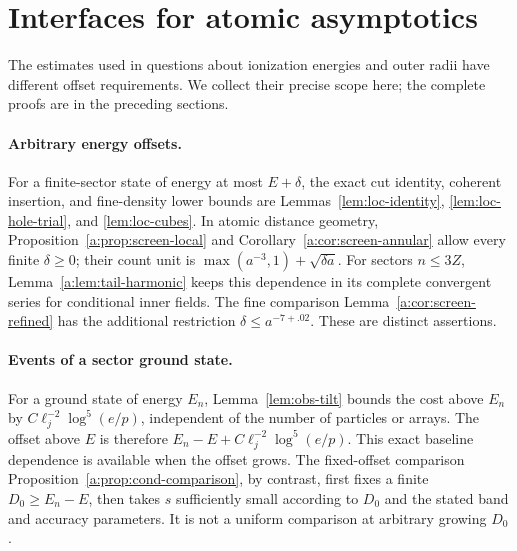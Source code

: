 \section{Interfaces for atomic asymptotics}\label{sec:interfaces}

The estimates used in questions about ionization energies and outer radii
have different offset requirements. We collect their precise scope here;
the complete proofs are in the preceding sections.

\paragraph{Arbitrary energy offsets.}
For a finite-sector state of energy at most $E+\delta$, the exact cut
identity, coherent insertion, and fine-density lower bounds are
Lemmas~\ref{lem:loc-identity}, \ref{lem:loc-hole-trial}, and
\ref{lem:loc-cubes}. In atomic distance geometry,
Proposition~\ref{a:prop:screen-local} and
Corollary~\ref{a:cor:screen-annular} allow every finite $\delta\ge0$;
their count unit is $\max(a^{-3},1)+\sqrt{\delta a}$.
For sectors $n\le3Z$, Lemma~\ref{a:lem:tail-harmonic} keeps this dependence in its complete
convergent series for conditional inner fields. The fine comparison
Lemma~\ref{a:cor:screen-refined} has the additional restriction
$\delta\le a^{-7+.02}$. These are distinct assertions.

\paragraph{Events of a sector ground state.}
For a ground state of energy $E_n$, Lemma~\ref{lem:obs-tilt} bounds the
cost above $E_n$ by $C\ell_j^{-2}\log^5(e/p)$, independent of the
number of particles or arrays. The offset above $E$ is therefore
$E_n-E+C\ell_j^{-2}\log^5(e/p)$. This exact baseline dependence is
available when the offset grows. The fixed-offset comparison
Proposition~\ref{a:prop:cond-comparison}, by contrast, first fixes a
finite $D_0\ge E_n-E$, then takes $s$ sufficiently small according to
$D_0$ and the stated band and accuracy parameters. It is not a uniform
comparison at arbitrary growing $D_0$.

